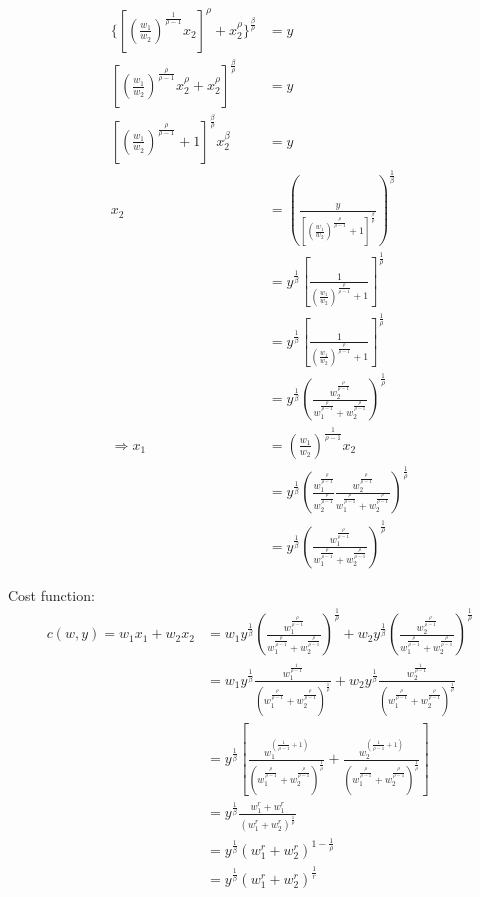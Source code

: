 \documentclass{article}
\begin{document}
\begin{align*}
\{[(\frac{w_1}{w_2})^{\frac{1}{\rho - 1}} x_2]^\rho + x_2^\rho\}^{\frac{\beta}{\rho}} &=y \\
[(\frac{w_1}{w_2})^{\frac{\rho}{\rho - 1}} x_2^\rho + x_2^\rho]^{\frac{\beta}{\rho}} &=y \\
[(\frac{w_1}{w_2})^{\frac{\rho}{\rho - 1}} + 1]^{\frac{\beta}{\rho}} x_2^\beta &=y \\
x_2 &= (\frac{y}{[(\frac{w_1}{w_2})^{\frac{\rho}{\rho - 1}} + 1]^{\frac{\beta}{\rho}} })^{\frac{1}{\beta}} \\
 &= y^{\frac{1}{\beta}} [\frac{1}{(\frac{w_1}{w_2})^{\frac{\rho}{\rho - 1}} + 1}]^{\frac{1}{\rho}} \\
&= y^{\frac{1}{\beta}} [\frac{1}{(\frac{w_1}{w_2})^{\frac{\rho}{\rho - 1}} + 1}]^{\frac{1}{\rho}} \\
&= y^{\frac{1}{\beta}} (\frac{w_2^{\frac{\rho}{\rho - 1}}}{w_1^{\frac{\rho}{\rho - 1}} + w_2^{\frac{\rho}{\rho - 1}}})^{\frac{1}{\rho}} \\
\Rightarrow x_1 &= (\frac{w_1}{w_2})^{\frac{1}{\rho - 1}} x_2  \\
&= y^{\frac{1}{\beta}} (\frac{w_1^{\frac{\rho}{\rho - 1}}   }{w_2^{\frac{\rho}{\rho - 1}}   } \frac{w_2^{\frac{\rho}{\rho - 1}}}{w_1^{\frac{\rho}{\rho - 1}} + w_2^{\frac{\rho}{\rho - 1}}})^{\frac{1}{\rho}}  \\
&=y^{\frac{1}{\beta}} (\frac{w_1^{\frac{\rho}{\rho - 1}}}{w_1^{\frac{\rho}{\rho - 1}} + w_2^{\frac{\rho}{\rho - 1}}})^{\frac{1}{\rho}} 
\end{align*}

Cost function: 
\begin{align*}
c(w,y) = w_1x_1 + w_2x_2 &= w_1y^{\frac{1}{\beta}} (\frac{w_1^{\frac{\rho}{\rho - 1}}}{w_1^{\frac{\rho}{\rho - 1}} + w_2^{\frac{\rho}{\rho - 1}}})^{\frac{1}{\rho}}  +w_2 y^{\frac{1}{\beta}} (\frac{w_2^{\frac{\rho}{\rho - 1}}}{w_1^{\frac{\rho}{\rho - 1}} + w_2^{\frac{\rho}{\rho - 1}}})^{\frac{1}{\rho}} \\
&= w_1y^{\frac{1}{\beta}} \frac{w_1^{\frac{1}{\rho - 1}}}{(w_1^{\frac{\rho}{\rho - 1}} + w_2^{\frac{\rho}{\rho - 1}})^{\frac{1}{\rho}}}  +w_2 y^{\frac{1}{\beta}} \frac{w_2^{\frac{1}{\rho - 1}}}{(w_1^{\frac{\rho}{\rho - 1}} + w_2^{\frac{\rho}{\rho - 1}})^{\frac{1}{\rho}}} \\
&=y^{\frac{1}{\beta}} [\frac{w_1^{(\frac{1}{\rho - 1}+1)}}{(w_1^{\frac{\rho}{\rho - 1}} + w_2^{\frac{\rho}{\rho - 1}})^{\frac{1}{\rho}}} + \frac{w_2^{(\frac{1}{\rho - 1}+1)}}{(w_1^{\frac{\rho}{\rho - 1}} + w_2^{\frac{\rho}{\rho - 1}})^{\frac{1}{\rho}}}] \\
&=y^{\frac{1}{\beta}}\frac{w_1^r+w_1^r}{(w_1^r + w_2^r)^{\frac{1}{\rho}}} \\
&=y^{\frac{1}{\beta}}{(w_1^r + w_2^r)^{1 - \frac{1}{\rho}}} \\
&=y^{\frac{1}{\beta}}{(w_1^r + w_2^r)^{\frac{1}{r}}} \\
\end{align*}
\end{document}
